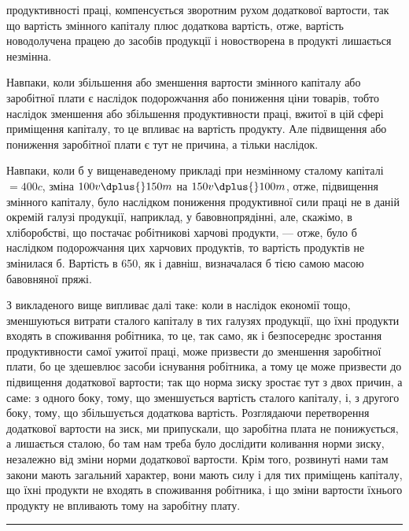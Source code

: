 \parcont{}  %
продуктивності праці, компенсується зворотним рухом додаткової вартости, так що
вартість змінного капіталу плюс додаткова вартість, отже, вартість новодолучена
працею до засобів продукції і новостворена в продукті лишається незмінна.

Навпаки, коли збільшення або зменшення вартости змінного капіталу або
заробітної плати є наслідок подорожчання або пониження ціни товарів, тобто
наслідок зменшення або збільшення продуктивности праці, вжитої в цій сфері
приміщення капіталу, то це впливає на вартість продукту. Але підвищення
або пониження заробітної плати є тут не причина, а тільки наслідок.

Навпаки, коли б у вищенаведеному прикладі при незмінному сталому
капіталі $= 400 c$, зміна $100 v \dplus{} 150 m$ на $150 v \dplus{} 100 m$, отже, підвищення
змінного капіталу, було наслідком пониження продуктивної сили праці не в даній
окремій галузі продукції, наприклад, у бавовнопрядінні, але, скажімо, в хліборобстві,
що постачає робітникові харчові продукти, — отже, було б наслідком
подорожчання цих харчових продуктів, то вартість продуктів не змінилася б.
Вартість в 650, як і давніш, визначалася б тією самою масою бавовняної пряжі.

З викладеного вище випливає далі таке: коли в наслідок економії тощо,
зменшуються витрати сталого капіталу в тих галузях продукції, що їхні продукти
входять в споживання робітника, то це, так само, як і безпосереднє зростання
продуктивности самої ужитої праці, може призвести до зменшення заробітної
плати, бо це здешевлює засоби існування робітника, а тому це може
призвести до підвищення додаткової вартости; так що норма зиску зростає тут
з двох причин, а саме: з одного боку, тому, що зменшується вартість сталого
капіталу, і, з другого боку, тому, що збільшується додаткова вартість. Розглядаючи
перетворення додаткової вартости на зиск, ми припускали, що заробітна
плата не понижується, а лишається сталою, бо там нам треба було дослідити
коливання норми зиску, незалежно від зміни норми додаткової вартости. Крім
того, розвинуті нами там закони мають загальний характер, вони мають силу
і для тих приміщень капіталу, що їхні продукти не входять в споживання робітника,
і що зміни вартости їхнього продукту не впливають тому на заробітну плату.

\pfbreak

